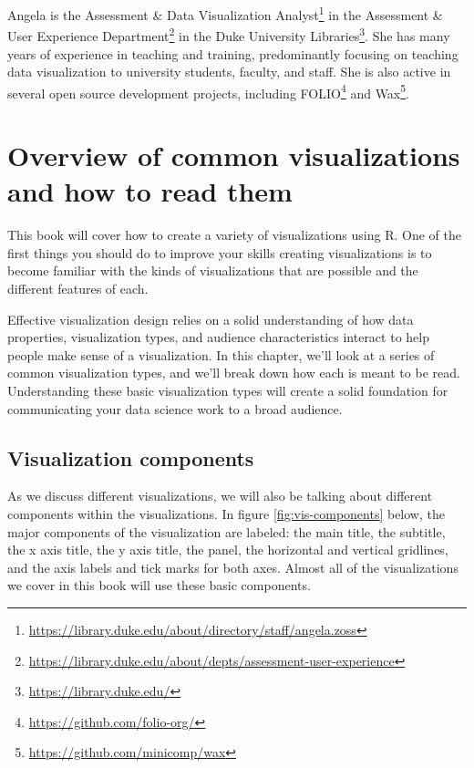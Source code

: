 \documentclass[
]{krantz}
\renewcommand{\href}[2]{#2\footnote{\url{#1}}}
\begin{document}
Angela is the \href{https://library.duke.edu/about/directory/staff/angela.zoss}{Assessment \& Data Visualization Analyst} in the \href{https://library.duke.edu/about/depts/assessment-user-experience}{Assessment \& User Experience Department} in the \href{https://library.duke.edu/}{Duke University Libraries}. She has many years of experience in teaching and training, predominantly focusing on teaching data visualization to university students, faculty, and staff. She is also active in several open source development projects, including \href{https://github.com/folio-org/}{FOLIO} and \href{https://github.com/minicomp/wax}{Wax}.

\mainmatter

\hypertarget{reading-visualizations}{%
\chapter{Overview of common visualizations and how to read them}\label{reading-visualizations}}

This book will cover how to create a variety of visualizations using R. One of the
first things you should do to improve your skills creating visualizations is to
become familiar with the kinds of visualizations that are possible and the different
features of each.

Effective visualization design relies on a solid understanding
of how data properties, visualization types, and audience characteristics interact
to help people make sense of a visualization. In this chapter, we'll look at
a series of common visualization types, and we'll break down how each is meant to
be read. Understanding these basic visualization types will create a solid foundation for
communicating your data science work to a broad audience.

\hypertarget{visualization-components}{%
\section{Visualization components}\label{visualization-components}}

As we discuss different visualizations, we will also be talking about different
components within the visualizations. In figure \ref{fig:vis-components} below,
the major components of the visualization are labeled: the main title, the subtitle,
the x axis title, the y axis title, the panel, the horizontal and vertical gridlines,
and the axis labels and tick marks for both axes. Almost all of the visualizations we cover
in this book will use these basic components.
\end{document}
